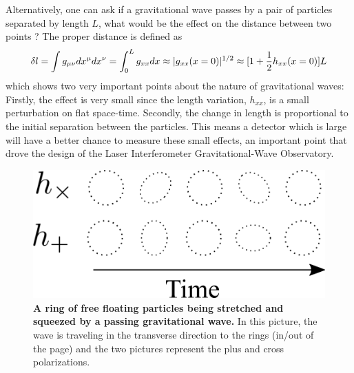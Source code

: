 	Alternatively, one can ask if a gravitational wave passes by a pair of particles separated by length $L$, what would be the effect on the distance between two points \cite{SaulsonStretch}?  The proper distance is defined as
	\begin{equation}\label{propdist}
	\delta l
	= \int{g_{\mu \nu} dx^{\mu} dx^{\nu}} \\
	= \int_{0}^{L}{g_{xx} {d}x}\\
	\approx |g_{xx}(x=0)|^{1/2}\\
	\approx [ 1 + \frac{1}{2} h_{xx}(x=0)] L
	\end{equation} 
	which shows two very important points about the nature of gravitational waves:  Firstly, the effect is very small since the length variation, $h_{xx}$, is a small perturbation on flat space-time.  Secondly, the change in length is proportional to the initial separation between the particles. This means a detector which is large will have a better chance to measure these small effects, an important point that drove the design of the Laser Interferometer Gravitational-Wave Observatory.
	\begin{figure}[ht]
		\centering
		\includegraphics[width=.4 \textwidth]{../Figures/GW_Particles.png}
		\caption[A ring of free floating particles being stretched and squeezed by a passing gravitational wave.]  
		{\textbf{A ring of free floating particles being stretched and squeezed by a passing gravitational wave.} 
		In this picture, the wave is traveling in the transverse direction to the rings (in/out of the page) and the two pictures represent the plus and cross polarizations.
		}
		\label{fig:gwparticles}
	\end{figure}

